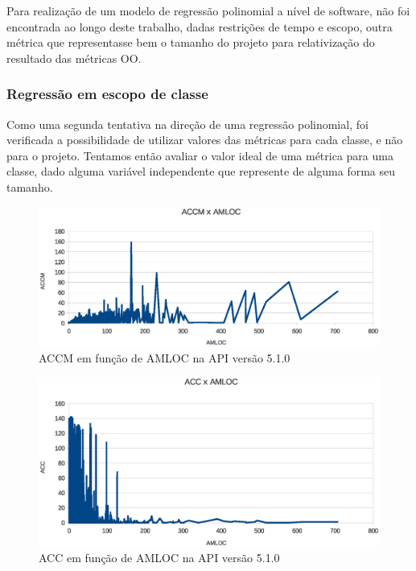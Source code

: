 Para realização de um modelo de regressão polinomial a nível de software, não foi encontrada ao longo deste trabalho, dadas restrições de tempo e escopo, outra métrica que representasse bem o tamanho do projeto para relativização do resultado das métricas OO. 

\subsubsection{Regressão em escopo de classe}

Como uma segunda tentativa na direção de uma regressão polinomial, foi verificada a possibilidade de utilizar valores das métricas para cada classe, e não para o projeto. Tentamos então avaliar o valor ideal de uma métrica para uma classe, dado alguma variável independente que represente de alguma forma seu tamanho.

\begin{figure}[!htb]
\centering
\includegraphics [keepaspectratio=true,scale=0.7]{figuras/accmxamloc510.eps}
\caption{ACCM em função de AMLOC na API versão 5.1.0}
\label{fig:accmxamloc510}
\end{figure}

\begin{figure}[!htb]
\centering
\includegraphics [keepaspectratio=true,scale=0.7]{figuras/accxamloc510.eps}
\caption{ACC em função de AMLOC na API versão 5.1.0}
\label{fig:accxamloc510}
\end{figure}


